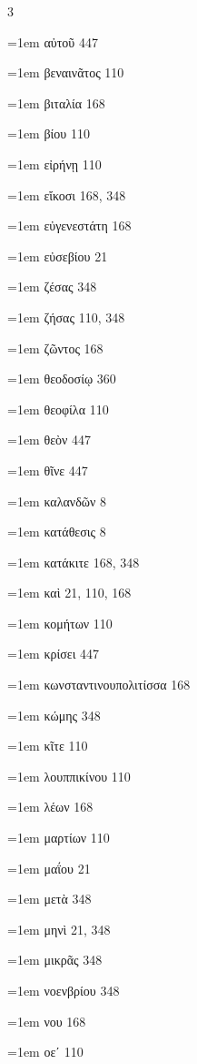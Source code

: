 \begin{multicols}{3}\footnotesize\setlength{\parindent}{0pt}\raggedright
\hangindent=1em αὐτοῦ 447\par
\hangindent=1em βεναινᾶτος 110\par
\hangindent=1em βιταλία 168\par
\hangindent=1em βίου 110\par
\hangindent=1em εἰρήνῃ 110\par
\hangindent=1em εἴκοσι 168, 348\par
\hangindent=1em εὐγενεστάτη 168\par
\hangindent=1em εὐσεβίου 21\par
\hangindent=1em ζέσας 348\par
\hangindent=1em ζήσας 110, 348\par
\hangindent=1em ζῶντος 168\par
\hangindent=1em θεοδοσίῳ 360\par
\hangindent=1em θεοφίλα 110\par
\hangindent=1em θεὸν 447\par
\hangindent=1em θῖνε 447\par
\hangindent=1em καλανδῶν 8\par
\hangindent=1em κατάθεσις 8\par
\hangindent=1em κατάκιτε 168, 348\par
\hangindent=1em καὶ 21, 110, 168\par
\hangindent=1em κομήτων 110\par
\hangindent=1em κρίσει 447\par
\hangindent=1em κωνσταντινουπολιτίσσα 168\par
\hangindent=1em κώμης 348\par
\hangindent=1em κῖτε 110\par
\hangindent=1em λουππικίνου 110\par
\hangindent=1em λέων 168\par
\hangindent=1em μαρτίων 110\par
\hangindent=1em μαΐου 21\par
\hangindent=1em μετὰ 348\par
\hangindent=1em μηνὶ 21, 348\par
\hangindent=1em μικρᾶς 348\par
\hangindent=1em νοενβρίου 348\par
\hangindent=1em νου 168\par
\hangindent=1em οεʹ 110\par

\end{multicols}
